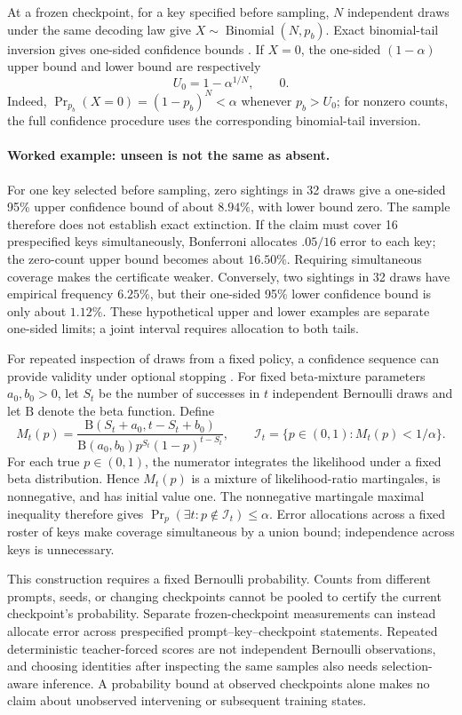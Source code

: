 \documentclass{article}
\newcommand{\1}{\mathbf 1}
\theoremstyle{remark}
\theoremstyle{definition}
\theoremstyle{plain}
\begin{document}
At a frozen checkpoint, for a key specified before sampling, $N$ independent
draws under the same decoding law give
$X\sim\operatorname{Binomial}(N,p_b)$. Exact binomial-tail inversion gives
one-sided confidence bounds \citep{clopper1934binomial}. If $X=0$, the
one-sided $(1-\alpha)$ upper bound and lower bound are respectively
\[
 U_0=1-\alpha^{1/N},\qquad 0.
\]
Indeed, $\Pr_{p_b}(X=0)=(1-p_b)^N<\alpha$ whenever $p_b>U_0$; for nonzero
counts, the full confidence procedure uses the corresponding binomial-tail
inversion.

\paragraph{Worked example: unseen is not the same as absent.}
For one key selected before sampling, zero sightings in 32 draws give a
one-sided 95\% upper confidence bound of about $8.94\%$, with lower bound
zero. The sample therefore does not establish exact extinction.
If the claim must cover 16 prespecified keys simultaneously, Bonferroni
allocates $.05/16$ error to each key; the zero-count upper bound becomes
about $16.50\%$. Requiring simultaneous coverage makes the certificate weaker.
Conversely, two sightings in 32 draws have empirical frequency $6.25\%$,
but their one-sided 95\% lower confidence bound is only about $1.12\%$.
These hypothetical upper and lower examples are separate one-sided limits;
a joint interval requires allocation to both tails.

For repeated inspection of draws from a fixed policy, a confidence sequence
can provide validity under optional stopping \citep{howard2021confidence}.
For fixed beta-mixture parameters $a_0,b_0>0$, let $S_t$ be the number of
successes in $t$ independent Bernoulli draws and let $\mathrm B$ denote
the beta function. Define
\[
 M_t(p)=\frac{\mathrm B(S_t+a_0,t-S_t+b_0)}
 {\mathrm B(a_0,b_0)p^{S_t}(1-p)^{t-S_t}},\qquad
 \mathcal I_t=\{p\in(0,1):M_t(p)<1/\alpha\}.
\]
For each true $p\in(0,1)$, the numerator integrates the likelihood under a
fixed beta distribution. Hence $M_t(p)$ is a mixture of likelihood-ratio
martingales, is nonnegative, and has initial value one. The nonnegative
martingale maximal inequality therefore gives
$\Pr_p(\exists t:p\notin\mathcal I_t)\le\alpha$. Error allocations across
a fixed roster of keys make coverage simultaneous by a union bound;
independence across keys is unnecessary.

This construction requires a fixed Bernoulli probability. Counts from
different prompts, seeds, or changing checkpoints cannot be pooled to
certify the current checkpoint's probability. Separate frozen-checkpoint
measurements can instead allocate error across prespecified
prompt--key--checkpoint statements. Repeated deterministic teacher-forced
scores are not independent Bernoulli observations, and choosing identities
after inspecting the same samples also needs selection-aware inference.
A probability bound at observed checkpoints alone makes no claim about
unobserved intervening or subsequent training states.
\end{document}
